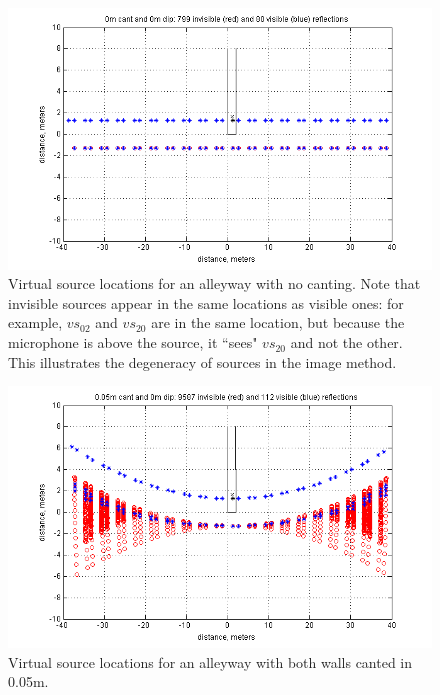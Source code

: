 \documentclass{aes137}
\begin{document}
\begin{figure}[h!] \centering \includegraphics[width=\linewidth, trim=13mm 2mm 10mm 3mm, clip]{images/ISM_0m_cant_0m_dip.png} \caption{Virtual source locations for an alleyway with no canting. Note that invisible sources appear in the same locations as visible ones: for example, $vs_{02}$ and $vs_{20}$ are in the same location, but because the microphone is above the source, it ``sees" $vs_{20}$ and not the other. This illustrates the degeneracy of sources in the image method.} \end{figure}

\begin{figure}[h!] \centering \includegraphics[width=\linewidth, trim=13mm 2mm 10mm 3mm, clip]{images/ISM_0pt05m_cant_0m_dip.png} \caption{Virtual source locations for an alleyway with both walls canted in 0.05m.} \end{figure}
\end{document}
